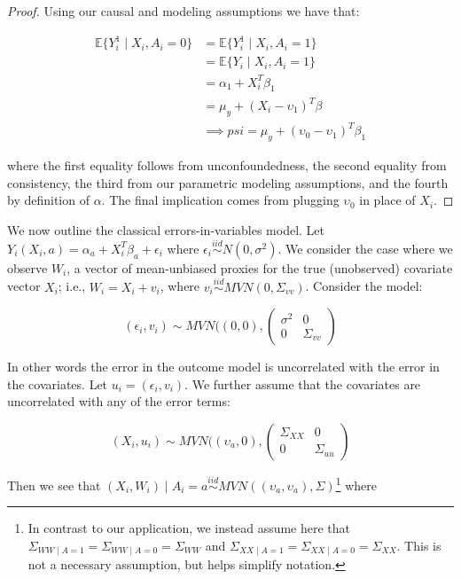 \begin{proof}

Using our causal and modeling assumptions we have that:

\begin{align*}
\mathbb{E}\{Y_i^1 \mid X_i, A_i = 0\} &= \mathbb{E}\{Y_i^1 \mid X_i, A_i = 1\} \\
&= \mathbb{E}\{Y_i \mid X_i, A_i = 1\} \\
&= \alpha_1 + X_i^T\beta_1 \\
&= \mu_y + (X_i - \upsilon_1)^T\beta \\
&\implies psi = \mu_y + (\upsilon_0 - \upsilon_1)^T\beta_1
\end{align*}

where the first equality follows from unconfoundedness, the second equality from consistency, the third from our parametric modeling assumptions, and the fourth by definition of $\alpha$. The final implication comes from plugging $\upsilon_0$ in place of $X_i$.

\end{proof}

We now outline the classical errors-in-variables model. Let $Y_i(X_i, a) = \alpha_a + X_i^T\beta_a + \epsilon_i$ where $\epsilon_i \stackrel{iid}\sim N(0, \sigma^2)$. We consider the case where we observe $W_i$, a vector of mean-unbiased proxies for the true (unobserved) covariate vector $X_i$; i.e., $W_i = X_i + v_i$, where $v_i \stackrel{iid}\sim MVN(0, \Sigma_{vv})$. Consider the model:

\begin{equation}
(\epsilon_i, v_i) \sim MVN((0, 0), \begin{pmatrix} 
\sigma^2 & 0 \\ 
0 & \Sigma_{vv}  
\end{pmatrix}
\end{equation}

In other words the error in the outcome model is uncorrelated with the error in the covariates. Let $u_i = (\epsilon_i, v_i)$. We further assume that the covariates are uncorrelated with any of the error terms:

\begin{equation}
(X_i, u_i) \sim MVN((\upsilon_a, 0), \begin{pmatrix} 
\Sigma_{XX} & 0 \\ 
0 & \Sigma_{uu}  
\end{pmatrix}
\end{equation}

Then we see that $(X_i, W_i) \mid A_i = a \stackrel{iid}{\sim} MVN((\upsilon_a, \upsilon_a), \Sigma)$\footnote{In contrast to our application, we instead assume here that $\Sigma_{WW \mid A = 1} = \Sigma_{WW \mid A = 0} = \Sigma_{WW}$ and $\Sigma_{XX \mid A = 1} = \Sigma_{XX \mid A = 0} = \Sigma_{XX}$. This is not a necessary assumption, but helps simplify notation.} where 


